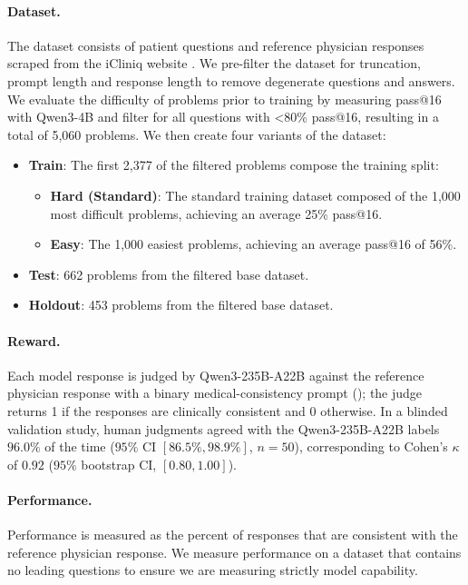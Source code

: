 \documentclass{article}
\begin{document}
\paragraph{Dataset.} The dataset consists of patient questions and reference physician responses scraped from the iCliniq website \citep{chatdoctor}. We pre-filter the dataset for truncation, prompt length and response length to remove degenerate questions and answers. We evaluate the difficulty of problems prior to training by measuring pass@16 with Qwen3-4B and filter for all questions with <80\% pass@16, resulting in a total of 5,060 problems. We then create four variants of the dataset:
\begin{itemize}
    \item \textbf{Train}: The first 2,377 of the filtered problems compose the training split:
        \begin{itemize}
            \item \textbf{Hard (Standard)}: The standard training dataset composed of the 1,000 most difficult problems, achieving an average 25\% pass@16.
            \item \textbf{Easy}: The 1,000 easiest problems, achieving an average pass@16 of 56\%. 
        \end{itemize}
    \item \textbf{Test}: 662 problems from the filtered base dataset. 
    \item \textbf{Holdout}: 453 problems from the filtered base dataset.
\end{itemize}

\paragraph{Reward.} Each model response is judged by Qwen3-235B-A22B against the reference physician response with a binary medical-consistency prompt (); the judge returns 1 if the responses are clinically consistent and 0 otherwise. In a blinded validation study, human judgments agreed with the Qwen3-235B-A22B labels $96.0\%$ of the time ($95\%$ CI $[86.5\%, 98.9\%]$, $n=50$), corresponding to Cohen's $\kappa$ of $0.92$ ($95\%$ bootstrap CI, $[0.80, 1.00]$).

\paragraph{Performance.} Performance is measured as the percent of responses that are consistent with the reference physician response. We measure performance on a dataset that contains no leading questions to ensure we are measuring strictly model capability. 
\end{document}
